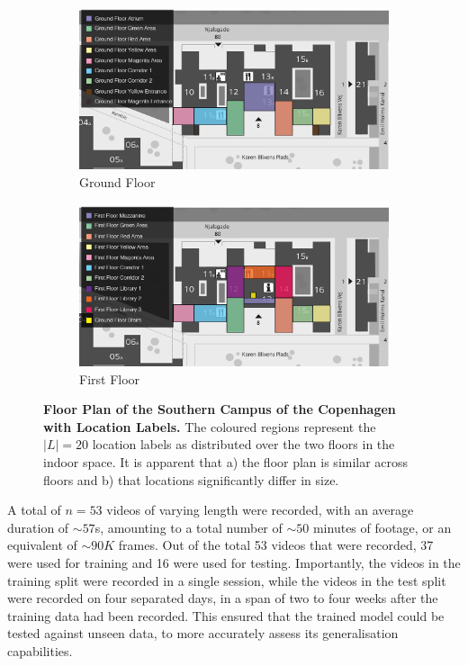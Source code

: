 \documentclass[a4paper]{article}
\begin{document}
  \begin{figure}[ht]
    \centering
    \begin{subfigure}[b]{.49\linewidth}
      \centering
      \includegraphics[width=\linewidth]{figures/map-ground-floor.jpg}
      \caption{Ground Floor}
      \label{fig:map-ground-floor}
    \end{subfigure}
    \hfill
    \begin{subfigure}[b]{0.49\linewidth}
      \centering
      \includegraphics[width=\linewidth]{figures/map-first-floor.jpg}
      \caption{First Floor}
      \label{fig:map-first-floor}
    \end{subfigure}
    \caption{
      \textbf{Floor Plan of the Southern Campus of the Copenhagen with Location
      Labels.} The coloured regions represent the $|L|=20$ location labels as
      distributed over the two floors in the indoor space. It is apparent that
      a) the floor plan is similar across floors and b) that locations
      significantly differ in size.
    }
    \label{fig:map}
  \end{figure}

  
  A total of $n=53$ videos of varying length were recorded, with an average
  duration of $\sim 57$s, amounting to a total number of $\sim 50$ minutes of
  footage, or an equivalent of $\sim 90K$ frames. Out of the total 53 videos
  that were recorded, 37 were used for training and 16 were used for testing.
  Importantly, the videos in the training split were recorded in a single
  session, while the videos in the test split were recorded on four separated
  days, in a span of two to four weeks after the training data had been
  recorded. This ensured that the trained model could be tested against unseen
  data, to more accurately assess its generalisation capabilities.
\end{document}
